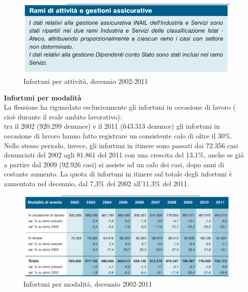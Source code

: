 \begin{figure}[H]
\centering
\includegraphics[scale=0.55]{images/analisiDiMercato/infortuniDecennioPerGestione2}
\caption{Infortuni per attività, decennio 2002-2011}
\end{figure}



\textbf{Infortuni per modalità}\\
La flessione ha riguardato esclusivamente gli infortuni in occasione di lavoro ( cioè durante il reale
ambito lavorativo):\\
tra il 2002 (920.299 denunce) e il 2011 (643.313 denunce) gli infortuni in occasione di
lavoro hanno fatto registrare un consistente calo di oltre il 30\%.\\

Nello stesso periodo, invece, gli infortuni in itinere sono passati dai 72.356 casi denunciati del 2002 agli 81.861 del 2011 con una crescita del 13,1\%, anche se già a partire dal
2009 (92.926 casi) si assiste ad un calo dei casi, dopo anni di costante aumento.
La quota di infortuni in itinere sul totale degli infortuni è aumentata nel decennio, dal
7,3\% del 2002 all’11,3\% del 2011.


\begin{figure}[H]
\centering
\includegraphics[scale=0.55]{images/analisiDiMercato/infortuniDecennioPerModalita}
\caption{Infortuni per modalità, decennio 2002-2011}
\end{figure}





